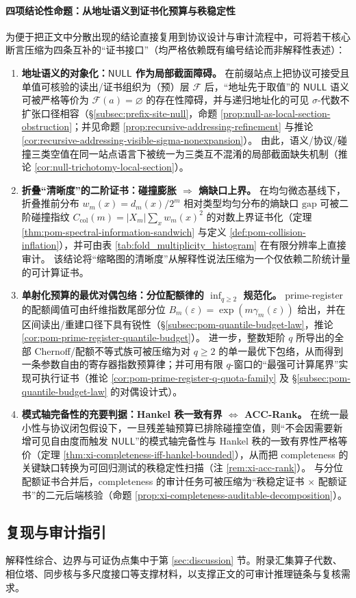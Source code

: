 \paragraph{四项结论性命题：从地址语义到证书化预算与秩稳定性}
为便于把正文中分散出现的结论直接复用到协议设计与审计流程中，可将若干核心断言压缩为四条互补的“证书接口”（均严格依赖既有编号结论而非解释性表述）：
\begin{enumerate}
  \item \textbf{地址语义的对象化：\(\mathsf{NULL}\) 作为局部截面障碍。}
  在前缀站点上把协议可接受且单值可核验的读出/证书组织为（预）层 \(\mathscr F\) 后，“地址先于取值”的 \(\mathsf{NULL}\) 语义可被严格等价为 \(\mathscr F(a)=\varnothing\) 的存在性障碍，并与递归地址化的可见 \(\sigma\)-代数不扩张口径相容（\S\ref{subsec:prefix-site-null}，命题 \ref{prop:null-as-local-section-obstruction}；并见命题 \ref{prop:recursive-addressing-refinement} 与推论 \ref{cor:recursive-addressing-visible-sigma-nonexpansion}）。
  由此，语义/协议/碰撞三类空值在同一站点语言下被统一为三类互不混淆的局部截面缺失机制（推论 \ref{cor:null-trichotomy-local-section}）。

  \item \textbf{折叠“清晰度”的二阶证书：碰撞膨胀 \(\Rightarrow\) 熵缺口上界。}
  在均匀微态基线下，折叠推前分布 \(w_m(x)=d_m(x)/2^m\) 相对类型均匀分布的熵缺口 \(\mathrm{gap}\) 可被二阶碰撞指纹
  \(C_{\mathrm{col}}(m)=|X_m|\sum_x w_m(x)^2\)
  的对数上界证书化（定理 \ref{thm:pom-spectral-information-sandwich} 与定义 \ref{def:pom-collision-inflation}），并可由表 \ref{tab:fold_multiplicity_histogram} 在有限分辨率上直接审计。
  该结论将“缩略图的清晰度”从解释性说法压缩为一个仅依赖二阶统计量的可计算证书。

  \item \textbf{单射化预算的最优对偶包络：分位配额律的 \(\inf_{q\ge 2}\) 规范化。}
  prime-register 的配额阈值可由纤维指数尾部分位 \(B_m(\varepsilon)=\exp(m\gamma_m(\varepsilon))\) 给出，并在区间读出/重建口径下具有锐性（\S\ref{subsec:pom-quantile-budget-law}，推论 \ref{cor:pom-prime-register-quantile-budget}）。
  进一步，整数矩阶 \(q\) 所导出的全部 Chernoff/配额不等式族可被压缩为对 \(q\ge 2\) 的单一最优下包络，从而得到一条参数自由的寄存器指数预算律；并可用有限 \(q\)-窗口的“最强可计算尾界”实现可执行证书（推论 \ref{cor:pom-prime-register-q-quota-family} 及 \S\ref{subsec:pom-quantile-budget-law} 的对偶设计式）。

  \item \textbf{模式轴完备性的充要判据：Hankel 秩一致有界 \(\Longleftrightarrow\) ACC-Rank。}
  在统一最小性与协议闭包假设下，一旦残差轴预算已排除碰撞空值，则“不会因需要新增可见自由度而触发 \(\mathsf{NULL}\)”的模式轴完备性与 Hankel 秩的一致有界性严格等价（定理 \ref{thm:xi-completeness-iff-hankel-bounded}），从而把 completeness 的关键缺口转换为可回归测试的秩稳定性扫描（注 \ref{rem:xi-acc-rank}）。
  与分位配额证书合并后，completeness 的审计任务可被压缩为“秩稳定证书 \(\times\) 配额证书”的二元后端核验（命题 \ref{prop:xi-completeness-auditable-decomposition}）。
\end{enumerate}

\subsection{复现与审计指引}\label{subsec:repro-audit-pointer}
解释性综合、边界与可证伪点集中于第 \ref{sec:discussion} 节。附录汇集算子代数、相位塔、同步核与多尺度接口等支撑材料，以支撑正文的可审计推理链条与复核需求。
